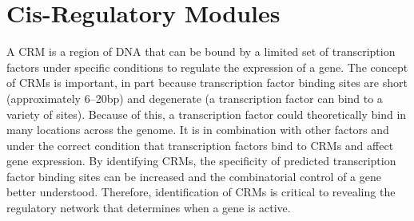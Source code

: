 \documentclass{frontiersENG} %
\begin{document}
\section{Cis-Regulatory Modules}
\label{section:crms}
A CRM is a region of DNA that can be bound by a limited set of
transcription factors under specific conditions to regulate the
expression of a gene. The concept of CRMs is important, in part
because transcription factor binding sites are short (approximately
6--20bp) and degenerate (a transcription factor can bind to a variety
of sites). Because of this, a transcription factor could theoretically
bind in many locations across the genome. It is in combination with
other factors and under the correct condition that transcription
factors bind to CRMs and affect gene expression. By identifying CRMs,
the specificity of predicted transcription factor binding sites can be
increased and the combinatorial control of a gene better
understood. Therefore, identification of CRMs is critical to revealing
the regulatory network that determines when a gene is active.
\end{document}
